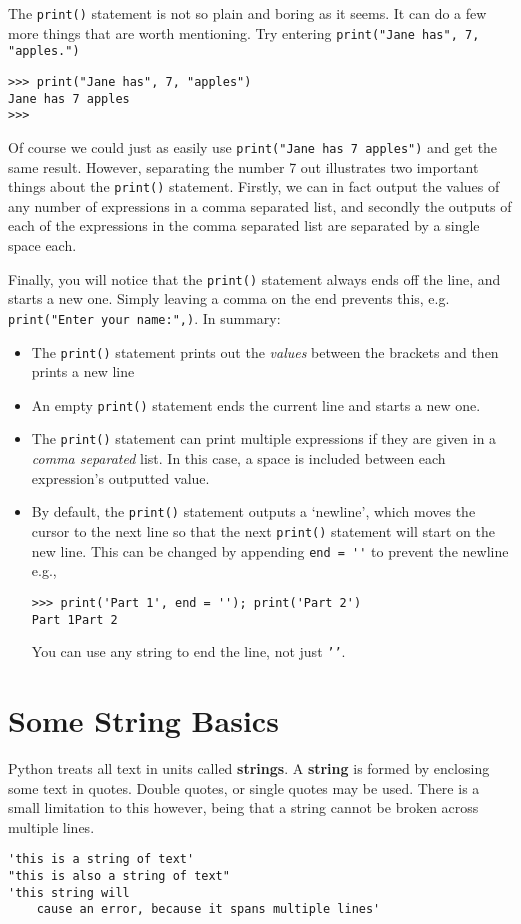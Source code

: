 The \texttt{print()} statement is not so plain and boring as it seems. It can   do a few more things that are worth mentioning. Try entering 
\texttt{print("Jane     has", 7, "apples.")}
\begin{lstlisting}
>>> print("Jane has", 7, "apples")
Jane has 7 apples
>>>
\end{lstlisting}

Of course we could just as easily use 
\texttt{print("Jane has 7   apples")} and get the same result. However, separating the number   7 out illustrates two important things about the \texttt{print()} statement.   Firstly, we can in fact output the values of any number of expressions   in a comma separated list, and secondly the outputs of each of the   expressions in the comma separated list are separated by a single space   each.

Finally, you will notice that the \texttt{print()} statement always ends off   the line, and starts a new one. Simply leaving a comma on the end   prevents this, e.g. 
\texttt{print("Enter your name:",)}. In summary:
\begin{itemize}
	\item The \texttt{print()} statement prints out the \textit{values}  between the     brackets and then prints a new line
	\item An empty \texttt{print()} statement ends the current line and starts a new     one.
	\item The \texttt{print()} statement can print multiple expressions if they are     given in a \textit{comma separated} list. In this case, a space is     included between each expression's outputted value.
	\item By default, the \texttt{print()} statement outputs a `newline', which moves the cursor to the next line so that the next \texttt{print()} statement will start on the new line. This can be changed by appending \lstinline{end = ''} to prevent the newline e.g.,
\begin{lstlisting}
>>> print('Part 1', end = ''); print('Part 2')
Part 1Part 2
\end{lstlisting}
You can use any string to end the line, not just \texttt{'{}'}.
\end{itemize}

\section{Some String Basics}

Python treats all text in units called \textbf{strings}. A \textbf{string} is formed   by enclosing some text in quotes. Double quotes, or single quotes may   be used. There is a small limitation to this however, being that a   string cannot be broken across multiple lines.
\begin{lstlisting}
'this is a string of text'
"this is also a string of text"
'this string will
    cause an error, because it spans multiple lines'
\end{lstlisting}

